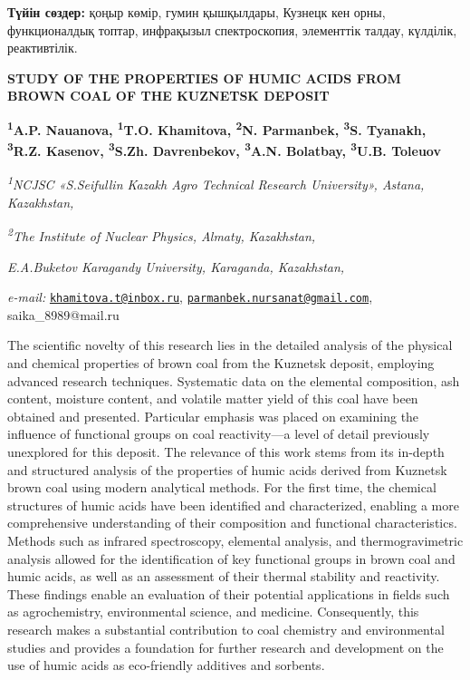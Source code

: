 {\bfseries Түйін сөздер:} қоңыр көмір, гумин қышқылдары, Кузнецк кен орны,
функционалдық топтар, инфрақызыл спектроскопия, элементтік талдау,
күлділік, реактивтілік.

\begin{articleheader}
{\bfseries STUDY OF THE PROPERTIES OF HUMIC ACIDS FROM BROWN COAL OF THE KUZNETSK DEPOSIT}

{\bfseries
\textsuperscript{1}A.P. Nauanova,
\textsuperscript{1}T.O. Khamitova\textsuperscript{\envelope },
\textsuperscript{2}N. Parmanbek\textsuperscript{\envelope },
\textsuperscript{3}S. Tyanakh\textsuperscript{\envelope },
\textsuperscript{3}R.Z. Kasenov,
\textsuperscript{3}S.Zh. Davrenbekov,
\textsuperscript{3}A.N. Bolatbay,
\textsuperscript{3}U.B. Toleuov}
\end{articleheader}

\begin{affiliation}
\emph{\textsuperscript{1}NCJSC «S.Seifullin Kazakh Agro Technical Research University», Astana, Kazakhstan,}

\emph{\textsuperscript{2}The Institute of Nuclear Physics, Almaty, Kazakhstan,}

\emph{E.A.Buketov Karagandy University, Karaganda, Kazakhstan,}

\emph{e-mail:} \href{mailto:khamitova.t@inbox.ru}{\nolinkurl{khamitova.t@inbox.ru}}, \href{mailto:parmanbek.nursanat@gmail.com}{\nolinkurl{parmanbek.nursanat@gmail.com}}, saika\_8989@mail.ru
\end{affiliation}

The scientific novelty of this research lies in the detailed analysis of
the physical and chemical properties of brown coal from the Kuznetsk
deposit, employing advanced research techniques. Systematic data on the
elemental composition, ash content, moisture content, and volatile
matter yield of this coal have been obtained and presented. Particular
emphasis was placed on examining the influence of functional groups on
coal reactivity---a level of detail previously unexplored for this
deposit. The relevance of this work stems from its in-depth and
structured analysis of the properties of humic acids derived from
Kuznetsk brown coal using modern analytical methods. For the first time,
the chemical structures of humic acids have been identified and
characterized, enabling a more comprehensive understanding of their
composition and functional characteristics. Methods such as infrared
spectroscopy, elemental analysis, and thermogravimetric analysis allowed
for the identification of key functional groups in brown coal and humic
acids, as well as an assessment of their thermal stability and
reactivity. These findings enable an evaluation of their potential
applications in fields such as agrochemistry, environmental science, and
medicine. Consequently, this research makes a substantial contribution
to coal chemistry and environmental studies and provides a foundation
for further research and development on the use of humic acids as
eco-friendly additives and sorbents.

